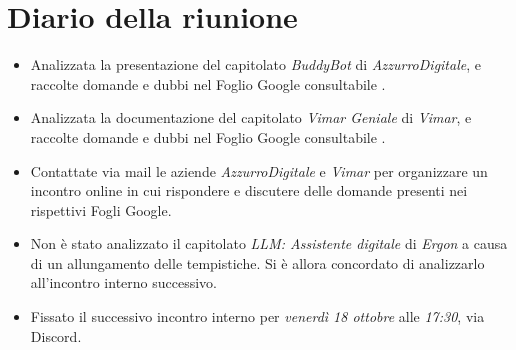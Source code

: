 \section{Diario della riunione}

\begin{itemize}
    \item Analizzata la presentazione del capitolato \emph{BuddyBot} di \emph{AzzurroDigitale}, e raccolte domande e dubbi nel Foglio Google consultabile .
    
    \item Analizzata la documentazione del capitolato \emph{Vimar Geniale} di \emph{Vimar}, e raccolte domande e dubbi nel Foglio Google consultabile .
    
    \item Contattate via mail le aziende \emph{AzzurroDigitale} e \emph{Vimar} per organizzare un incontro online in cui rispondere e discutere delle domande presenti nei rispettivi Fogli Google.

    \item Non è stato analizzato il capitolato \emph{LLM: Assistente digitale} di \emph{Ergon} a causa di un allungamento delle tempistiche. Si è allora concordato di analizzarlo all'incontro interno successivo.

    \item Fissato il successivo incontro interno per \emph{venerdì 18 ottobre} alle \emph{17:30}, via Discord.
\end{itemize}